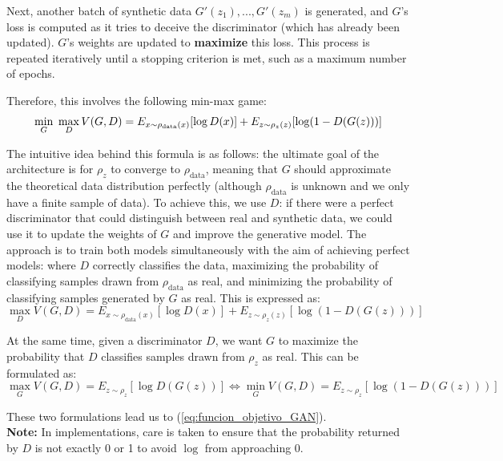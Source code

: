 Next, another batch of synthetic data ${G'(z_1),...,G'(z_m)}$ is generated, and $G$'s loss is computed as it tries to deceive the discriminator (which has already been updated). $G$'s weights are updated to \textbf{maximize} this loss. This process is repeated iteratively until a stopping criterion is met, such as a maximum number of epochs.

Therefore, this involves the following min-max game:
\begin{equation}
\min_G \hspace{0.3 em} \max_D V(G,D) = E_{x \sim \rho_{\text{data}}(x)}[\log D(x)] + E_{z \sim \rho_z(z)}[\log(1 - D(G(z)))]
\label{eq:funcion_objetivo_GAN}
\end{equation}

The intuitive idea behind this formula is as follows: the ultimate goal of the architecture is for $\rho_z$ to converge to $\rho_{\text{data}}$, meaning that $G$ should approximate the theoretical data distribution perfectly (although $\rho_{\text{data}}$ is unknown and we only have a finite sample of data). To achieve this, we use $D$: if there were a perfect discriminator that could distinguish between real and synthetic data, we could use it to update the weights of $G$ and improve the generative model. The approach is to train both models simultaneously with the aim of achieving perfect models: where $D$ correctly classifies the data, maximizing the probability of classifying samples drawn from $\rho_{\text{data}}$ as real, and minimizing the probability of classifying samples generated by $G$ as real. This is expressed as:
\begin{equation*}
\max_D V(G,D) = E_{x \sim \rho_{\text{data}}(x)}[\log D(x)] + E_{z \sim \rho_z(z)}[\log(1 - D(G(z)))]
\end{equation*}

At the same time, given a discriminator $D$, we want $G$ to maximize the probability that $D$ classifies samples drawn from $\rho_z$ as real. This can be formulated as:
\begin{equation*}
\max_G V(G,D) = E_{z \sim \rho_z}[\log D(G(z))] \Leftrightarrow \min_G V(G,D) = E_{z \sim \rho_z} [\log(1 - D(G(z)))]
\end{equation*}

These two formulations lead us to (\ref{eq:funcion_objetivo_GAN}).\\
\textbf{Note:} In implementations, care is taken to ensure that the probability returned by $D$ is not exactly 0 or 1 to avoid $\log$ from approaching 0.\\

